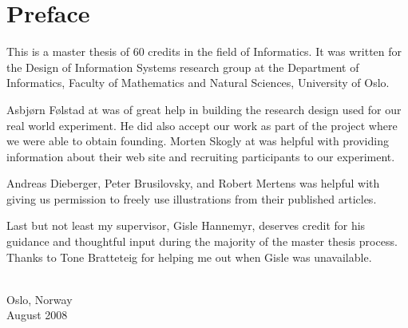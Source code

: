 \chapter{Preface}

This is a master thesis of 60 credits%
in the field of Informatics. It was written for the Design of Information
Systems research group at the 
Department of Informatics,
Faculty of Mathematics and Natural Sciences,
University of Oslo.

Asbj\o{}rn F\o{}lstad at  was of great help in building the
research design used for our real world experiment.
He did also accept our work as part of the  project where we
were able to obtain founding.
Morten Skogly at  \urort{} was helpful with providing information
about their web site and recruiting participants to our experiment.

Andreas Dieberger, Peter Brusilovsky, and Robert Mertens was helpful with
giving us permission to freely use illustrations from their
published articles.

Last but not least my supervisor, Gisle Hannemyr, deserves credit for
his guidance and thoughtful input during the majority of the master thesis
process. Thanks to Tone Bratteteig for helping me out when Gisle was
unavailable.

{ \\ Oslo, Norway \\ August 2008\par}
